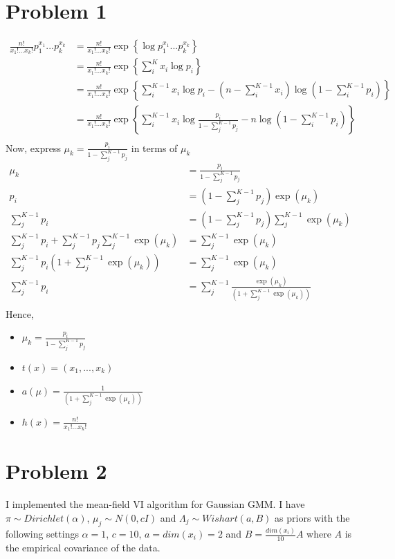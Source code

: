 \documentclass[twoside]{homework}
\begin{document}
\maketitle

\section*{Problem 1}
\begin{align*}
\frac{n!}{x_1!...x_k!}p_1^{x_1}...p_k^{x_k}
&= \frac{n!}{x_1!...x_k!} \exp \left\{ \log p_1^{x_1}...p_k^{x_k} \right\} \\
&= \frac{n!}{x_1!...x_k!} \exp \left\{ \sum_i^K x_i \log p_i \right\} \\
&= \frac{n!}{x_1!...x_k!} \exp \left\{ \sum_i^{K-1} x_i \log p_i - (n - \sum_i^{K-1} x_i)\log(1 - \sum_i^{K-1} p_i) \right\} \\
&= \frac{n!}{x_1!...x_k!} \exp \left\{ \sum_i^{K-1} x_i \log \frac{p_i}{1 - \sum_j^{K-1} p_j} - n \log(1 - \sum_i^{K-1} p_i) \right\} \\
\end{align*}
Now, express $\mu_k = \frac{p_i}{1 - \sum_j^{K-1} p_j}$ in terms of $\mu_k$
\begin{align*}
\mu_k &= \frac{p_i}{1 - \sum_j^{K-1} p_j} \\
p_i &= (1 - \sum_j^{K-1} p_j) \exp(\mu_k) \\
\sum_j^{K-1} p_i &= (1 - \sum_j^{K-1} p_j) \sum_j^{K-1} \exp(\mu_k) \\
\sum_j^{K-1} p_i +  \sum_j^{K-1} p_j \sum_j^{K-1} \exp(\mu_k) &= \sum_j^{K-1} \exp(\mu_k) \\
\sum_j^{K-1} p_i (1 + \sum_j^{K-1}  \exp(\mu_k)) &= \sum_j^{K-1} \exp(\mu_k) \\
\sum_j^{K-1} p_i  &= \sum_j^{K-1} \frac{\exp(\mu_k)}{(1 + \sum_j^{K-1} \exp(\mu_k))} \\
\end{align*}
Hence,
\begin{itemize}
\item $\mu_k =  \frac{p_i}{1 - \sum_j^{K-1} p_j}$
\item $t(x) = (x_1, ..., x_k)$
\item $a(\mu) = \frac{1}{{(1 + \sum_j^{K-1} \exp(\mu_k))}}$
\item $h(x)= \frac{n!}{x_1!...x_k!}$
\end{itemize}

\section*{Problem 2}
I implemented the mean-field VI algorithm for Gaussian GMM. I have $\pi \sim Dirichlet(\alpha)$, $\mu_j \sim N(0, cI)$ and $\Lambda_j \sim Wishart(a, B)$ as priors with the following settings $\alpha = 1$, $c = 10$, $a = dim(x_i) = 2$ and $B = \frac{dim(x_i)}{10} A$ where $A$ is the empirical covariance of the data. 
\end{document}
